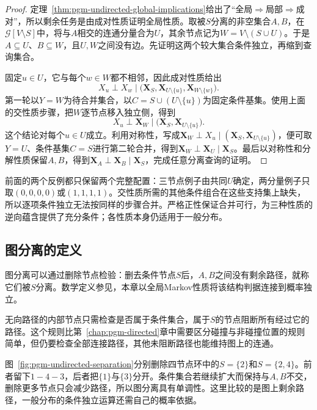 \begin{proof}
定理~\ref{thm:pgm-undirected-global-implications}给出了“全局$\Rightarrow$局部$\Rightarrow$成对”，所以剩余任务是由成对性质证明全局性质。取被$S$分离的非空集合$A,B$，在$\mathcal{G}[V\setminus S]$中，将与$A$相交的连通分量合为$U$，其余节点记为$W=V\setminus(S\cup U)$。于是$A\subseteq U$、$B\subseteq W$，且$U,W$之间没有边。先证明这两个较大集合条件独立，再缩到查询集合。

固定$u\in U$，它与每个$w\in W$都不相邻，因此成对性质给出
\[
  X_u\perp X_w
  \mid
  \bigl(\bm{X}_S,\bm{X}_{U\setminus\{u\}},
        \bm{X}_{W\setminus\{w\}}\bigr).
\]
第一轮以$Y=W$为待合并集合，以$C=S\cup(U\setminus\{u\})$为固定条件基集。使用上面的交性质步骤，把$W$逐节点移入独立侧，得到
\[
  X_u\perp\bm{X}_W
  \mid\bigl(\bm{X}_S,\bm{X}_{U\setminus\{u\}}\bigr).
\]
这个结论对每个$u\in U$成立。利用对称性，写成$\bm{X}_W\perp X_u\mid(\bm{X}_S,\bm{X}_{U\setminus\{u\}})$，便可取$Y=U$、条件基集$C=S$进行第二轮合并，得到$\bm{X}_W\perp\bm{X}_U\mid\bm{X}_S$。最后以对称性和分解性质保留$A,B$，得到$\bm{X}_A\perp\bm{X}_B\mid\bm{X}_S$，完成任意分离查询的证明。
\end{proof}

前面的两个反例都只保留两个完整配置：三节点例子由共同$U$确定，两分量例子只取$(0,0,0,0)$或$(1,1,1,1)$。交性质所需的其他条件组合在这些支持集上缺失，所以逐项条件独立无法按同样的步骤合并。严格正性保证合并可行，为三种性质的逆向蕴含提供了充分条件；各性质本身仍适用于一般分布。

\subsection{图分离的定义}
\label{sec:pgm-undirected-separation}

图分离可以通过删除节点检验：删去条件节点$S$后，$A,B$之间没有剩余路径，就称它们被$S$分离。数学定义参见，本章以全局Markov性质将该结构判据连接到概率独立。

无向路径的内部节点只需检查是否属于条件集合，属于$S$的节点阻断所有经过它的路径。这个规则比第~\ref{chap:pgm-directed}章中需要区分碰撞与非碰撞位置的规则简单，但仍要检查全部连接路径，其他未阻断路径也能维持图上的连通。

图~\ref{fig:pgm-undirected-separation}分别删除四节点环中的$S=\{2\}$和$S=\{2,4\}$。前者留下$1-4-3$，后者把$\{1\}$与$\{3\}$分开。条件集合若继续扩大而保持与$A,B$不交，删除更多节点只会减少路径，所以图分离具有单调性。这里比较的是图上剩余路径，一般分布的条件独立运算还需自己的概率依据。

